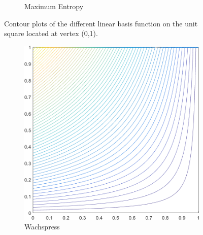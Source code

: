 \begin{figure}
{\begin{subfigure}[b]{0.39\textwidth}
		\caption{Maximum Entropy}
	\end{subfigure}
}
\caption[Contour plots of the linear basis functions on the unit square.]{Contour plots of the different linear basis function on the unit square located at vertex (0,1).}
\label{fig::2D_Linear_Summary_unit_square_basis_functions}
\end{figure}

\begin{figure}
\centering
{
	\begin{subfigure}[b]{0.39\textwidth}
		\centering
		\includegraphics[width=\textwidth]{figures/sec_BF/deg_square_WACHSPRESS1_contour_b5.png}
		\caption{Wachspress}
	\end{subfigure}
	\hspace{1.5cm}
	\begin{subfigure}[b]{0.39\textwidth}
		\centering

\end{subfigure}}
\end{figure}
